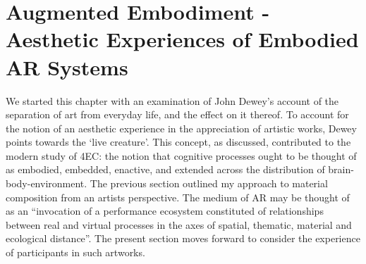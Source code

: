 \section[Augmented Embodiment]{Augmented Embodiment - Aesthetic Experiences of Embodied AR Systems}\label{sec: theory-embodiment}
We started this chapter with an examination of John Dewey’s account of the separation of art from everyday life, and the effect on it thereof. To account for the notion of an aesthetic experience in the appreciation of artistic works, Dewey points towards the ‘live creature’. This concept, as discussed, contributed to the modern study of 4EC: the notion that cognitive processes ought to be thought of as embodied, embedded, enactive, and extended across the distribution of brain-body-environment. The previous section outlined my approach to material composition from an artists perspective. The medium of AR may be thought of as an “invocation of a performance ecosystem constituted of relationships between real and virtual processes in the axes of spatial, thematic, material and ecological distance”. The present section moves forward to consider the experience of participants in such artworks.

